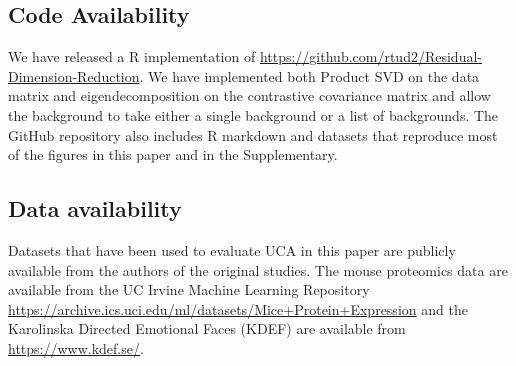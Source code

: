 \documentclass[12pt]{article}
\begin{document}
\subsection{Code Availability}
We have released a R implementation of \href{https://github.com/rtud2/Residual-Dimension-Reduction}{https://github.com/rtud2/Residual-Dimension-Reduction}. We have implemented both Product SVD on the data matrix and eigendecomposition on the contrastive covariance matrix and allow the background to take either a single background or a list of backgrounds. The GitHub repository also includes R markdown and datasets that reproduce most of the figures in this paper and in the Supplementary.

\subsection{Data availability}
Datasets that have been used to evaluate UCA in this paper are publicly available from the authors of the original studies. The mouse proteomics data are available from the UC Irvine Machine Learning Repository \url{https://archive.ics.uci.edu/ml/datasets/Mice+Protein+Expression}\cite{Higuera} and the Karolinska Directed Emotional Faces (KDEF) are available from \url{https://www.kdef.se/}\cite{Calvo2008}.







\end{document}
